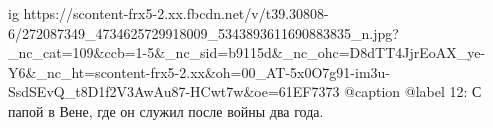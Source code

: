  
 
 
 
 

\ifcmt
  ig https://scontent-frx5-2.xx.fbcdn.net/v/t39.30808-6/272087349_4734625729918009_5343893611690883835_n.jpg?_nc_cat=109&ccb=1-5&_nc_sid=b9115d&_nc_ohc=D8dTT4JjrEoAX_ye-Y6&_nc_ht=scontent-frx5-2.xx&oh=00_AT-5x0O7g91-im3u-SsdSEvQ_t8D1f2V3AwAu87-HCwt7w&oe=61EF7373
  @caption @label 12: С папой в Вене, где он служил после войны два года.
\fi
